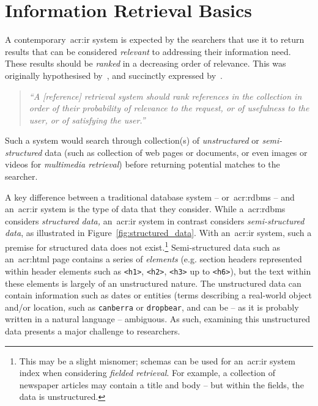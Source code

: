 \section{Information Retrieval Basics}
A contemporary~\gls{acr:ir} system is expected by the searchers that use it to return results that can be considered \emph{relevant} to addressing their information need. These results should be \emph{ranked} in a decreasing order of relevance. This was originally hypothesised by~\cite{luhn1957ranking_query}, and succinctly expressed by~\cite{robertson1977prp}.

\begin{quote}
    \emph{``A [reference] retrieval system should rank references in the collection in order of their probability of relevance to the request, or of usefulness to the user, or of satisfying the user.''}
\end{quote}

Such a system would search through collection(s) of \emph{unstructured} or \emph{semi-structured} data (such as collection of web pages or documents, or even images or videos for \emph{multimedia retrieval}) before returning potential matches to the searcher.

A key difference between a traditional database system -- or~\gls{acr:rdbms} -- and an~\gls{acr:ir} system is the type of data that they consider. While a~\gls{acr:rdbms} considers \emph{structured data,} an~\gls{acr:ir} system in contrast considers \emph{semi-structured data}, as illustrated in Figure~\ref{fig:structured_data}. With an~\gls{acr:ir} system, such a premise for structured data does not exist.\footnote{This may be a slight misnomer; schemas can be used for an~\gls{acr:ir} system index when considering \emph{fielded retrieval}. For example, a collection of newspaper articles may contain a title and body -- but within the fields, the data is unstructured.} Semi-structured data such as an~\gls{acr:html} page contains a series of \emph{elements} (e.g. section headers represented within header elements such as \texttt{<h1>}, \texttt{<h2>}, \texttt{<h3>} up to \texttt{<h6>}), but the text within these elements is largely of an unstructured nature. The unstructured data can contain information such as dates or entities (terms describing a real-world object and/or location, such as \texttt{canberra} or \texttt{dropbear}, and can be -- as it is probably written in a natural language -- ambiguous. As such, examining this unstructured data presents a major challenge to researchers.

